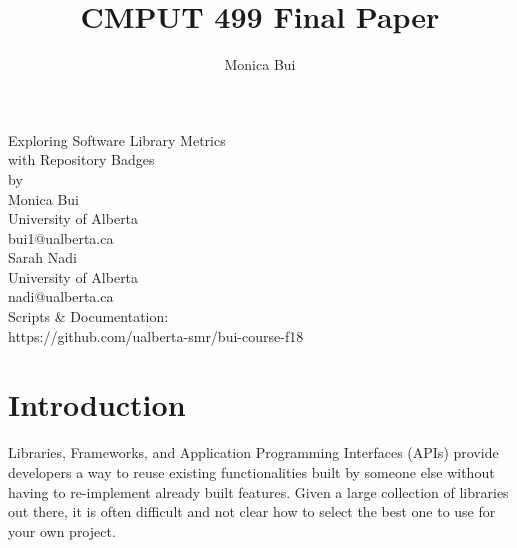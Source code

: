 \documentclass[12pt, letterpaper]{article}
\title{CMPUT 499 Final Paper}
\author{Monica Bui}
\begin{document}
\begin{titlepage}
    \centering
    \large
    \vspace{1cm}
    Exploring Software Library Metrics \\ 
    with Repository Badges \\
    \vspace{1cm}
    by \\
    \vspace{1cm}
    Monica Bui \\
    University of Alberta \\
    bui1@ualberta.ca \\
    \vspace{1cm}
    Sarah Nadi \\
    University of Alberta \\
    nadi@ualberta.ca \\
    \vspace{6cm}
    Scripts \& Documentation: \\
    https://github.com/ualberta-smr/bui-course-f18
\end{titlepage}

\tableofcontents

\listoffigures
\newpage

\section{Introduction} 

Libraries, Frameworks, and Application Programming Interfaces (APIs) provide developers 
a way to reuse existing functionalities
built by someone else without having to re-implement already built features. 
Given a large collection of libraries out there,
it is often difficult and not clear how to select the best one to use for your own project. 
\end{document}
